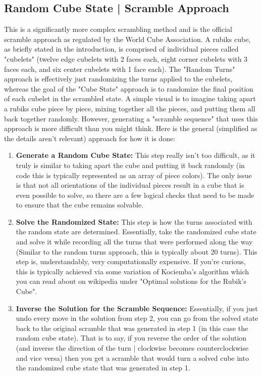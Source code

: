 \documentclass[12pt,letterpaper]{article}
\numberwithin{equation}{section}
\begin{document}
\subsection{Random Cube State | Scramble Approach}
This is a significantly more complex scrambling method and is the official scramble approach as regulated by the World Cube Association. A rubiks cube, as briefly stated in the introduction, is comprised of individual pieces called "cubelets" (twelve edge cubelets with 2 faces each, eight corner cubelets with 3 faces each, and six center cubelets with 1 face each). The "Random Turns" approach is effectively just randomizing the turns applied to the cubelets, whereas the goal of the "Cube State" approach is to randomize the final position of each cubelet in the scrambled state. A simple visual is to imagine taking apart a rubiks cube piece by piece, mixing together all the pieces, and putting them all back together randomly. However, generating a "scramble sequence" that uses this approach is more difficult than you might think. Here is the general (simplified as the details aren't relevant) approach for how it is done:

\begin{enumerate}
    \item \textbf{Generate a Random Cube State:} This step really isn't too difficult, as it truly is similar to taking apart the cube and putting it back randomly (in code this is typically represented as an array of piece colors). The only issue is that not all orientations of the individual pieces result in a cube that is even possible to solve, so there are a few logical checks that need to be made to ensure that the cube remains solvable. 

    \item \textbf{Solve the Randomized State:} This step is how the turns associated with the random state are determined. Essentially, take the randomized cube state and solve it while recording all the turns that were performed along the way (Similar to the random turns approach, this is typically about 20 turns). This step is, understandably, very computationally expensive. If you're curious, this is typically achieved via some variation of Kociemba's algorithm which you can read about on wikipedia under "Optimal solutions for the Rubik's Cube".

    \item \textbf{Inverse the Solution for the Scramble Sequence:} Essentially, if you just undo every move in the solution from step 2, you can go from the solved state back to the original scramble that was generated in step 1 (in this case the random cube state). That is to say, if you reverse the order of the solution (and inverse the direction of the turn | clockwise becomes counterclockwise and vice versa) then you get a scramble that would turn a solved cube into the randomized cube state that was generated in step 1.
\end{enumerate}
\end{document}
